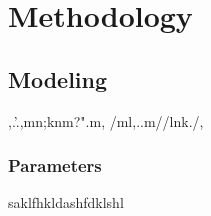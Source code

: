 \chapter{Methodology}

\section{Modeling}
,.'.,mn;knm?".m, /ml,..m//lnk./,
\subsection{Parameters}

\cite{ringach2004haphazard}

saklfhkldashfdklshl~\cite{paik2010synaptic}